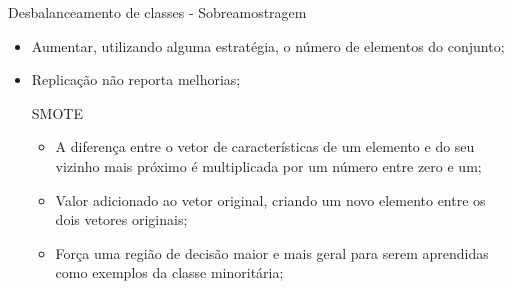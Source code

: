 \documentclass{beamer}
\begin{document}
\begin{frame}{Desbalanceamento de classes - Sobreamostragem}
    \begin{itemize}
        \item Aumentar, utilizando alguma estratégia, o número de elementos do conjunto;
        \item Replicação não reporta melhorias;
    \begin{block}{SMOTE}
    \justifying
        \begin{itemize}
            \item A diferença entre o vetor de características de um elemento e do seu vizinho mais próximo é multiplicada por um número entre zero e um;
            \item Valor adicionado ao vetor original, criando um novo elemento entre os dois vetores originais;
            \item Força uma região de decisão maior e mais geral para serem aprendidas como exemplos da classe minoritária;
        \end{itemize}
    \end{block}
    \end{itemize}





\end{frame}
\end{document}

